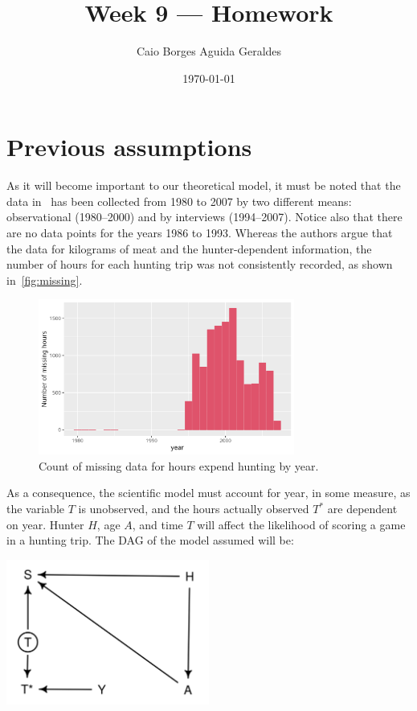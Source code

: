 \documentclass[article, a4paper, 12pt]{memoir}
\author{Caio Borges Aguida Geraldes}
\title{Week 9 --- Homework}
\date{\today}
\begin{document}
\maketitle

\chapter*{Previous assumptions}

As it will become important to our theoretical model, it must be noted that the data in~\textcite{HillKintigh2009} has been collected from 1980 to 2007 by two different means: observational (1980--2000) and by interviews (1994--2007).
Notice also that there are no data points for the years 1986 to 1993.
Whereas the authors argue that the data for kilograms of meat and the hunter\hyp{}dependent information, the number of hours for each hunting trip was not consistently recorded, as shown in~\autoref{fig:missing}.

\begin{figure}[!htb]
\begin{center}
    \includegraphics[width=0.75\textwidth]{./plots/missing.png}
\end{center}
\caption{Count of missing data for hours expend hunting by year.}\label{fig:missing}
\end{figure}

As a consequence, the scientific model must account for year, in some measure, as the variable $T$ is unobserved, and the hours actually observed $T^*$ are dependent on year.
Hunter $H$, age $A$, and time $T$ will affect the likelihood of scoring a game in a hunting trip.
The DAG of the model assumed will be:

\begin{center}
    \includegraphics[width=0.5\textwidth]{./plots/dag.png}
\end{center}
\end{document}
